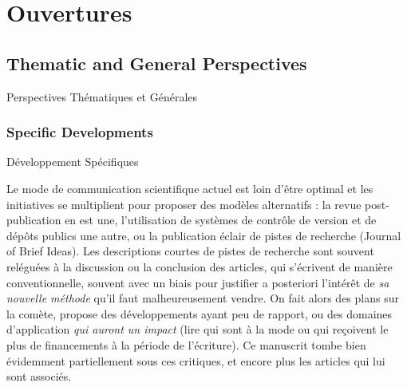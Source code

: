


\chapter*{Ouvertures}

\label{ch:opening}


\newpage

\section*{Thematic and General Perspectives}{Perspectives Thématiques et Générales}



%


\subsection*{Specific Developments}{Développement Spécifiques}



Le mode de communication scientifique actuel est loin d'être optimal %
et les initiatives se multiplient pour proposer des modèles alternatifs : la revue post-publication en est une, l'utilisation de systèmes de contrôle de version et de dépôts publics une autre, ou la publication éclair de pistes de recherche (Journal of Brief Ideas). %
Les descriptions courtes de pistes de recherche sont souvent reléguées à la discussion ou la conclusion des articles, qui s'écrivent de manière conventionnelle, souvent avec un biais pour justifier a posteriori l'intérêt de \emph{sa nouvelle méthode} qu'il faut malheureusement vendre. On fait alors des plans sur la comète, propose des développements ayant peu de rapport, ou des domaines d'application \emph{qui auront un impact} (lire qui sont à la mode ou qui reçoivent le plus de financements à la période de l'écriture). %
Ce manuscrit tombe bien évidemment partiellement sous ces critiques, et encore plus les articles qui lui sont associés.


